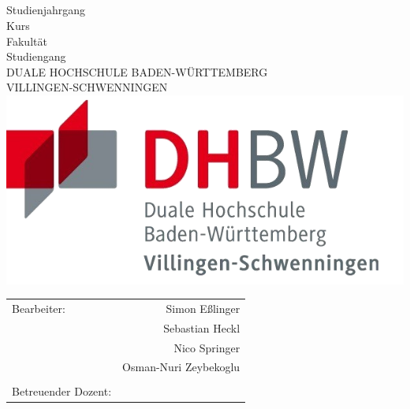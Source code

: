 
\thispagestyle{empty}

\begin{center}
\vspace*{1cm} \ \\
{\fontsize{40}{48}\selectfont \bfseries \mytitlewithlinebreaks \\}
\vspace{0.75cm}
{\Large\bfseries \mysubtitlewithlinebreaks \\}
\vspace{1.5cm}
\mytexttype \\
Studienjahrgang \myyearofstudy \\
Kurs \mycourse \\
\vspace{1.5cm}
Fakultät \myfaculty \\
Studiengang \mycourseofstudy \\
DUALE HOCHSCHULE BADEN-WÜRTTEMBERG\\
VILLINGEN-SCHWENNINGEN\\
\vspace{2.5cm}
\includegraphics[width=.45\linewidth]{../assets/dhbw-vs-logo}
\end{center}
\begin{table}[b]
\centering
\begin{tabularx}{\textwidth}{Xr}
Bearbeiter: 		&	Simon Eßlinger \\
                    &	Sebastian Heckl \\
                    &	Nico Springer \\
                    &	Osman-Nuri Zeybekoglu \\
                    & \\
Betreuender Dozent:	&	\mylecturer \\
\end{tabularx}\\
\end{table}
